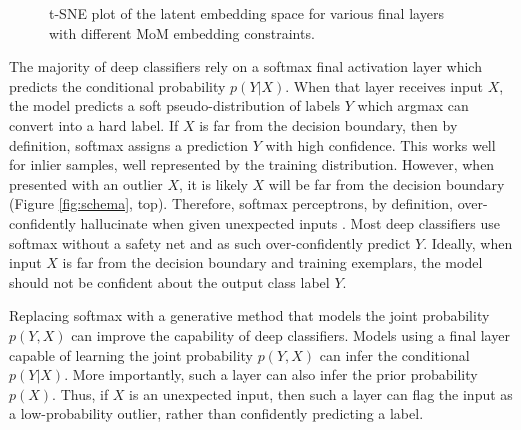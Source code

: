 \documentclass[10pt,twocolumn,letterpaper]{article}
\begin{document}
\begin{figure}[ht]
\begin{subfigure}[t]{.24\textwidth}
		\subcaption{}
	\end{subfigure}
	\caption{t-SNE\cite{tsne} plot of the latent embedding space for various final layers with different MoM embedding constraints.} 
	\label{fig:cifar10tsne}
\end{figure}

The majority of deep classifiers rely on a softmax final activation layer which predicts the conditional probability $p(Y|X)$.
When that layer receives input $X$, the model predicts a soft pseudo-distribution of labels $Y$ which argmax can convert into a hard label.
If $X$ is far from the decision boundary, then by definition, softmax assigns a prediction $Y$ with high confidence.
This works well for inlier samples, well represented by the training distribution.
However, when presented with an outlier $X$, it is likely $X$ will be far from the decision boundary (Figure \ref{fig:schema}, top).
Therefore, softmax perceptrons, by definition, over-confidently hallucinate when given unexpected inputs \cite{wei2022mitigating}. 
Most deep classifiers use softmax without a safety net and as such over-confidently predict $Y$.
Ideally, when input $X$ is far from the decision boundary and training exemplars, the model should not be confident about the output class label $Y$.

Replacing softmax with a generative method that models the joint probability $p(Y,X)$ can improve the capability of deep classifiers. 
Models using a final layer capable of learning the joint probability $p(Y,X)$ can infer the conditional $p(Y|X)$.
More importantly, such a layer can also infer the prior probability $p(X)$.
Thus, if $X$ is an unexpected input, then such a layer can flag the input as a low-probability outlier, rather than confidently predicting a label.
\end{document}
